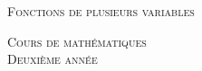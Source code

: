 
\pagestyle{empty}\thispagestyle{empty}
\vspace*{\fill}
\begin{center}
\fontsize{32}{32}\selectfont
\textsc{Fonctions de plusieurs variables}
\end{center}
\vfill
\begin{center}
\huge
\textsc{Cours de mathématiques}\\ 
\textsc{Deuxième année}
\end{center}

\begin{center}
\end{center}
\clearemptydoublepage






{}
\tableofcontents

\clearemptydoublepage
